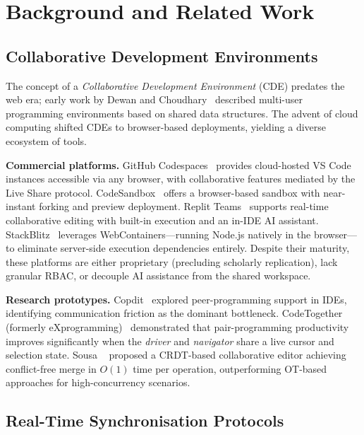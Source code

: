 \section{Background and Related Work}
\label{sec:background}

\subsection{Collaborative Development Environments}

The concept of a \emph{Collaborative Development Environment} (CDE) predates
the web era; early work by Dewan and Choudhary~\cite{dewan1995flexible}
described multi-user programming environments based on shared data
structures. The advent of cloud computing shifted CDEs to browser-based
deployments, yielding a diverse ecosystem of tools.

\textbf{Commercial platforms.}
GitHub Codespaces~\cite{githubcodespaces2023} provides cloud-hosted VS Code
instances accessible via any browser, with collaborative features mediated by
the Live Share protocol. CodeSandbox~\cite{codesandbox2023} offers a
browser-based sandbox with near-instant forking and preview deployment. Replit
Teams~\cite{replit2024} supports real-time collaborative editing with built-in
execution and an in-IDE AI assistant. StackBlitz~\cite{stackblitz2023}
leverages WebContainers---running Node.js natively in the browser---to
eliminate server-side execution dependencies entirely. Despite their maturity,
these platforms are either proprietary (precluding scholarly replication),
lack granular RBAC, or decouple AI assistance from the shared workspace.

\textbf{Research prototypes.}
Copdit~\cite{cheng2017codeit} explored peer-programming support in IDEs,
identifying communication friction as the dominant bottleneck. CodeTogether
(formerly eXprogramming)~\cite{codetogether2021} demonstrated that
pair-programming productivity improves significantly when the \emph{driver}
and \emph{navigator} share a live cursor and selection state. Sousa
\etal~\cite{sousa2022realtime} proposed a CRDT-based collaborative editor
achieving conflict-free merge in $O(1)$ time per operation, outperforming
OT-based approaches for high-concurrency scenarios.

\subsection{Real-Time Synchronisation Protocols}

